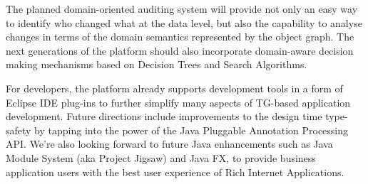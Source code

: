   The planned domain-oriented auditing system will provide not only an easy way to identify who changed what at the data level, but also the capability to analyse changes in terms of the domain semantics represented by the object graph.  
  The next generations of the platform should also incorporate domain-aware decision making mechanisms based on Decision Trees and Search Algorithms.

  For developers, the platform already supports development tools in a form of Eclipse IDE plug-ins to further simplify many aspects of TG-based application development. Future directions include improvements to the design time type-safety by tapping into the power of the Java Pluggable Annotation Processing API.
  We're also looking forward to future Java enhancements such as Java Module System (aka Project Jigsaw) and Java FX, to provide business application users with the best user experience of Rich Internet Applications.